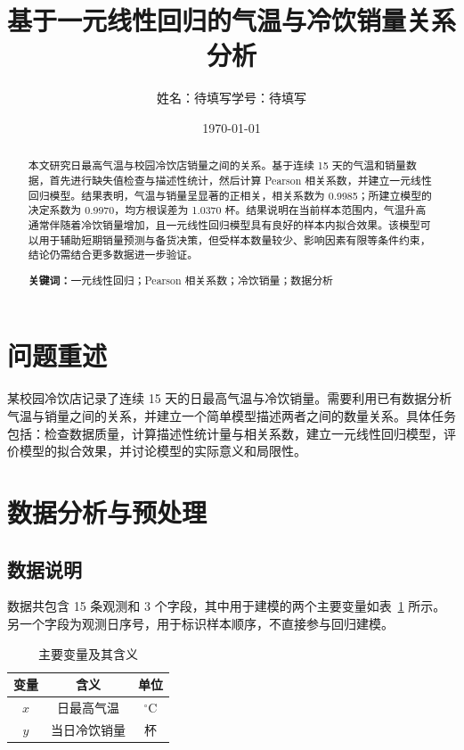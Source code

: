 \documentclass[UTF8,12pt,a4paper]{ctexart}
\title{基于一元线性回归的气温与冷饮销量关系分析}
\author{姓名：待填写\quad 学号：待填写}
\date{\today}
\begin{document}
\maketitle

\begin{abstract}
本文研究日最高气温与校园冷饮店销量之间的关系。基于连续 15 天的气温和销量数据，首先进行缺失值检查与描述性统计，然后计算 Pearson 相关系数，并建立一元线性回归模型。结果表明，气温与销量呈显著的正相关，相关系数为 0.9985；所建立模型的决定系数为 0.9970，均方根误差为 1.0370 杯。结果说明在当前样本范围内，气温升高通常伴随着冷饮销量增加，且一元线性回归模型具有良好的样本内拟合效果。该模型可以用于辅助短期销量预测与备货决策，但受样本数量较少、影响因素有限等条件约束，结论仍需结合更多数据进一步验证。

\noindent\textbf{关键词：}一元线性回归；Pearson 相关系数；冷饮销量；数据分析
\end{abstract}

\section{问题重述}

某校园冷饮店记录了连续 15 天的日最高气温与冷饮销量。需要利用已有数据分析气温与销量之间的关系，并建立一个简单模型描述两者之间的数量关系。具体任务包括：检查数据质量，计算描述性统计量与相关系数，建立一元线性回归模型，评价模型的拟合效果，并讨论模型的实际意义和局限性。

\section{数据分析与预处理}

\subsection{数据说明}

数据共包含 15 条观测和 3 个字段，其中用于建模的两个主要变量如表~\ref{tab:variables} 所示。另一个字段为观测日序号，用于标识样本顺序，不直接参与回归建模。

\begin{table}[H]
    \centering
    \caption{主要变量及其含义}
    \label{tab:variables}
    \begin{tabular}{ccc}
        \toprule
        变量 & 含义 & 单位 \\
        \midrule
        $x$ & 日最高气温 & $^\circ$C \\
        $y$ & 当日冷饮销量 & 杯 \\
        \bottomrule
    \end{tabular}
\end{table}
\end{document}
